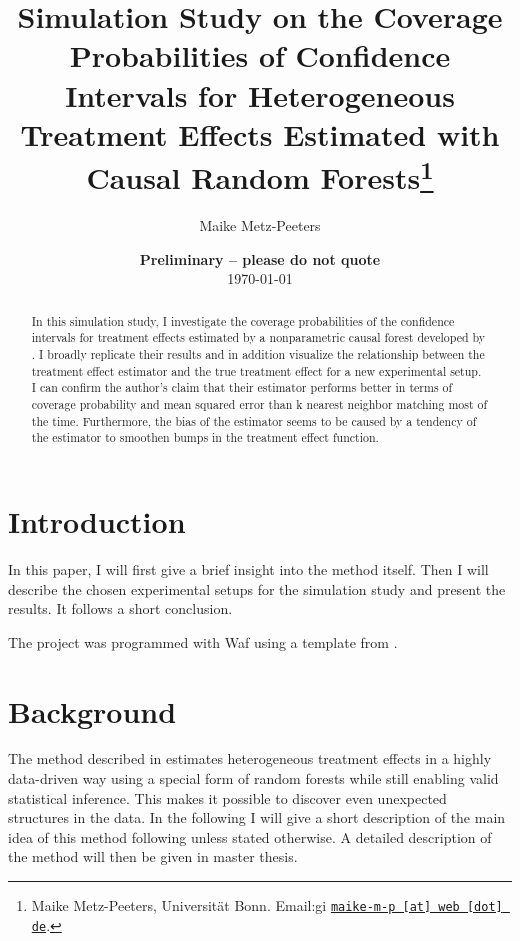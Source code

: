 \documentclass[11pt, a4paper, leqno]{article}
\begin{document}
\title{Simulation Study on the Coverage Probabilities of Confidence Intervals for Heterogeneous Treatment Effects Estimated with Causal Random Forests\thanks{Maike Metz-Peeters, Universität Bonn. Email:gi \href{mailto:maike-m-p@web.de}{\nolinkurl{maike-m-p [at] web [dot] de}}.}}

\author{Maike Metz-Peeters}

\date{
{\bf Preliminary -- please do not quote} 
\\[1ex] 
\today
}

\maketitle


\begin{abstract}
	In this simulation study, I investigate the coverage probabilities of the confidence intervals for treatment effects estimated by a nonparametric causal forest developed by \citet{wa18}. I broadly replicate their results and in addition visualize the relationship between the treatment effect estimator and the true treatment effect for a new experimental setup. I can confirm the author's claim that their estimator performs better in terms of coverage probability and mean squared error than k nearest neighbor matching most of the time. Furthermore, the bias of the estimator seems to be caused by a tendency of the estimator to smoothen bumps in the treatment effect function.
\end{abstract}
\clearpage

\section{Introduction} %
\label{sec:introduction}

In this paper, I will first give a brief insight into the method itself. Then I will describe the chosen experimental setups for the simulation study and present the results. It follows a short conclusion.


The project was programmed with Waf using a template from \citet{GaudeckerEconProjectTemplates}. 


\section{Background} %
\label{sec:background}
The method described in \citet{wa18} estimates heterogeneous treatment effects in a highly data-driven way using a special form of random forests while still enabling valid statistical inference. This makes it possible to discover even unexpected structures in the data. In the following I will give a short description of the main idea of this method following \citet{wa18} unless stated otherwise. A detailed description of the method will then be given in master thesis. 
\end{document}
